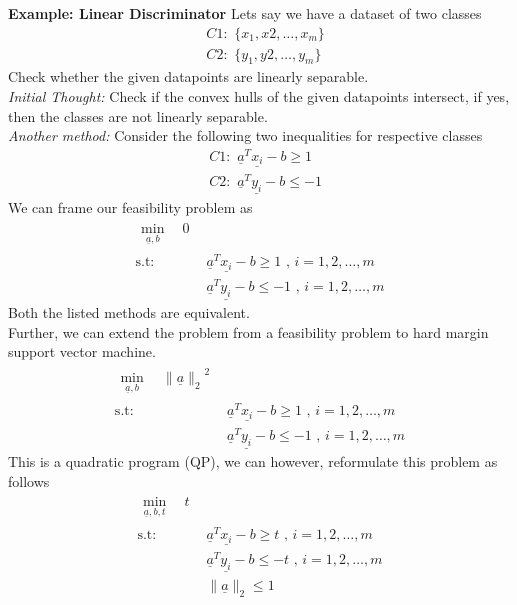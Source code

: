\documentclass{tufte-handout}
\theoremstyle{remark}
\renewcommand{\vec}[1]{\underline{#1}}
\newcommand\norm[1]{\ensuremath{\lVert#1\rVert_2}}
\newcommand\twospace{\,\,}
\begin{document}
\textbf{Example: Linear Discriminator}
Lets say we have a dataset of two classes
\begin{align}
    &C1:\twospace \{x_1,x2,\dots,x_m\}\nonumber\\
    &C2:\twospace \{y_1,y2,\dots,y_m\}\nonumber
\end{align}
Check whether the given datapoints are linearly separable.\\
\textit{Initial Thought:} Check if the convex hulls of the given datapoints intersect, if yes, then the classes are not linearly separable.\\
\textit{Another method:} Consider the following two inequalities for respective classes
\begin{align}
    &C1:\twospace \vec{a}^T\vec{x_i}-b\geq 1 \\
    &C2:\twospace \vec{a}^T\vec{y_i}-b\leq -1 \nonumber
\end{align}
We can frame our feasibility problem as
\begin{align}
    \begin{split}
        \min_{\vec{a},b}\, &\twospace 0
    \end{split}\\ 
    \text{s.t:}
    \twospace & \vec{a}^T\vec{x_i}-b\geq1 \twospace ,\, i= 1,2,\dots,m\\
    & \vec{a}^T\vec{y_i}-b\leq-1 \twospace ,\, i= 1,2,\dots,m \nonumber
\end{align}
Both the listed methods are equivalent.\\
Further, we can extend the problem from a feasibility problem to hard margin support vector machine.
\begin{align}
    \begin{split}
        \min_{\vec{a},b}\, &\twospace\norm{\vec{a}}^2
    \end{split}\\ 
    \text{s.t:}
    \twospace & \vec{a}^T\vec{x_i}-b \geq 1 \twospace ,\, i= 1,2,\dots,m\\
    & \vec{a}^T\vec{y_i}-b \leq -1 \twospace ,\, i= 1,2,\dots,m \nonumber
\end{align}
This is a quadratic program (QP), we can however, reformulate this problem as follows
\begin{align}
    \begin{split}
        \min_{\vec{a},b,t}\, &\twospace t
    \end{split}\\ 
    \text{s.t:}
    \twospace & \vec{a}^T\vec{x_i}-b \geq t \twospace ,\, i= 1,2,\dots,m\\
    & \vec{a}^T\vec{y_i}-b \leq -t \twospace ,\, i= 1,2,\dots,m \nonumber\\
    & \norm{\vec{a}}\leq 1 \nonumber
\end{align}
\end{document}

